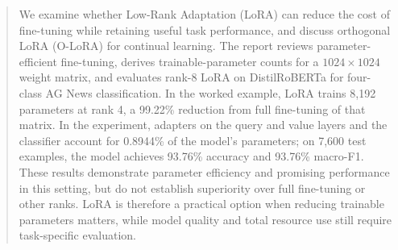 \begin{abstract}
	We examine whether Low-Rank Adaptation (LoRA) can reduce the cost of
	fine-tuning while retaining useful task performance, and discuss
	orthogonal LoRA (O-LoRA) for continual learning. The report reviews
	parameter-efficient fine-tuning, derives trainable-parameter counts
	for a $1024 \times 1024$ weight matrix, and evaluates rank-8 LoRA on
	DistilRoBERTa for four-class AG News classification. In the worked
	example, LoRA trains 8,192 parameters at rank 4, a 99.22\% reduction
	from full fine-tuning of that matrix. In the experiment, adapters on
	the query and value layers and the classifier account for 0.8944\% of
	the model's parameters; on 7,600 test examples, the model achieves
	93.76\% accuracy and 93.76\% macro-F1. These results demonstrate
	parameter efficiency and promising performance in this setting, but
	do not establish superiority over full fine-tuning or other ranks.
	LoRA is therefore a practical option when reducing trainable
	parameters matters, while model quality and total resource use still
	require task-specific evaluation.
\end{abstract}

